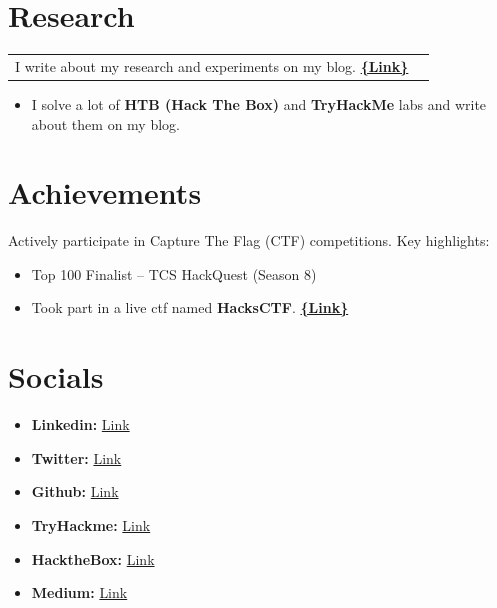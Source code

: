 \documentclass[a4paper,12pt]{article}
\begin{document}
\section{\textbf{Research}}
\begin{tabularx}{\linewidth}{@{}l X@{}}{I write about my research and experiments on my blog. \hspace{0.5cm}     \href{https://medium.com/@xenofer}{\textbf{\{Link\}}}}
\end{tabularx}
\begin{itemize}
    \item I solve a lot of \textbf{HTB (Hack The Box)} and \textbf{TryHackMe} labs and write about them on my blog.
\end{itemize}

\section{\textbf{Achievements}}
Actively participate in Capture The Flag (CTF) competitions. Key highlights:
\begin{itemize}
    \item Top 100 Finalist -- TCS HackQuest (Season 8)
    \item Took part in a live ctf named \textbf{HacksCTF}. \hspace{0.5cm} \href{https://drive.google.com/file/d/1NL_6BI3KcTJFqS_EWWkIEAhACCWk3aDL/view?usp=sharing}{\textbf{\{Link\}}}
\end{itemize}

\section{\textbf{Socials}}
\begin{itemize}
    \item \textbf{Linkedin: }\href{https://www.linkedin.com/in/manik-das-38ba41243/}{ Link}
    \item \textbf{Twitter: }\href{https://twitter.com/Xenofer01}{Link}
    \item \textbf{Github: }\href{https://github.com/XENOFER}{ Link}
    \item \textbf{TryHackme: }\href{https://tryhackme.com/p/XENOFER}{ Link}
    \item \textbf{HacktheBox: }\href{https://app.hackthebox.com/profile/1195849}{ Link}
    \item \textbf{Medium: }\href{https://medium.com/@xenofer}{Link}
\end{itemize}
\end{document}
